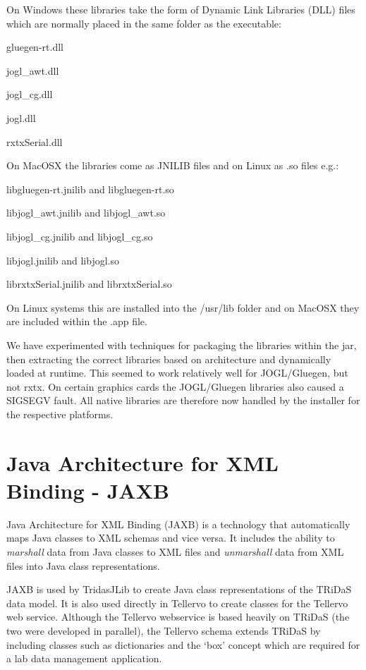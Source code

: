 On Windows these libraries take the form of Dynamic Link Libraries (DLL) files which are normally placed in the same folder as the executable:

\begin{itemize*}
 \item gluegen-rt.dll
 \item jogl\_awt.dll
 \item jogl\_cg.dll
 \item jogl.dll
 \item rxtxSerial.dll
\end{itemize*}

On MacOSX the libraries come as JNILIB files and on Linux as .so files e.g.:

\begin{itemize*}
 \item libgluegen-rt.jnilib and libgluegen-rt.so
 \item libjogl\_awt.jnilib and libjogl\_awt.so
 \item libjogl\_cg.jnilib and libjogl\_cg.so
 \item libjogl.jnilib and libjogl.so
 \item librxtxSerial.jnilib and librxtxSerial.so
\end{itemize*}

On Linux systems this are installed into the /usr/lib folder and on MacOSX they are included within the .app file.

We have experimented with techniques for packaging the libraries within the jar, then extracting the correct libraries based on architecture and dynamically loaded at runtime.  This seemed to work relatively well for JOGL/Gluegen, but not rxtx.  On certain graphics cards the JOGL/Gluegen libraries also caused a SIGSEGV fault.  All native libraries are therefore now handled by the installer for the respective platforms.  


\section{Java Architecture for XML Binding - JAXB}
\label{txt:jaxb}

Java Architecture for XML Binding (JAXB) is a technology that automatically maps Java classes to XML schemas and vice versa.  It includes the ability to \emph{marshall} data from Java classes to XML files and \emph{unmarshall} data from XML files into Java class representations.  

JAXB is used by TridasJLib to create Java class representations of the TRiDaS data model.  It is also used directly in Tellervo to create classes for the Tellervo web service.  Although the Tellervo webservice is based heavily on TRiDaS (the two were developed in parallel), the Tellervo schema extends TRiDaS by including classes such as dictionaries and the `box' concept which are required for a lab data management application.  

